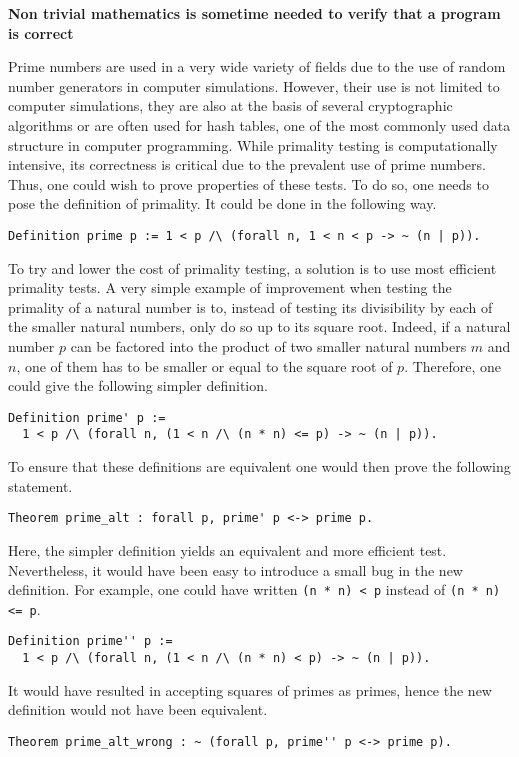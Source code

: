 \pagebreak
\begin{framed}
\begin{center}
{\bf \Large Non trivial mathematics is sometime needed to verify that a program is correct}
\end{center}

Prime numbers are used in a very wide variety of fields due
to the use of random number generators in computer simulations.
However, their use is not limited to computer simulations, they are
also at the basis of several cryptographic algorithms or are often
used for hash tables, one of the most commonly used data structure in
computer programming.  While primality testing is computationally
intensive, its correctness is critical due to the prevalent use of
prime numbers.  Thus, one could wish to prove properties of these
tests.  To do so, one needs to pose the definition of primality.  It
could be done in the following way.

\begin{verbatim}
Definition prime p := 1 < p /\ (forall n, 1 < n < p -> ~ (n | p)).
\end{verbatim}

To try and lower the cost of primality testing, a solution is to use
most efficient primality tests.  A very simple example of improvement
when testing the primality of a natural number is to, instead of
testing its divisibility by each of the smaller natural numbers, only
do so up to its square root.  Indeed, if a natural number $p$ can be
factored into the product of two smaller natural numbers $m$ and $n$,
one of them has to be smaller or equal to the square root of $p$.
Therefore, one could give the following simpler definition.

\begin{verbatim}
Definition prime' p :=
  1 < p /\ (forall n, (1 < n /\ (n * n) <= p) -> ~ (n | p)).
\end{verbatim}

To ensure that these definitions are equivalent one would then prove
the following statement.

\begin{verbatim}
Theorem prime_alt : forall p, prime' p <-> prime p.
\end{verbatim}

Here, the simpler definition yields an equivalent and more efficient
test.  Nevertheless, it would have been easy to introduce a small bug
in the new definition.  For example, one could have written
\verb!(n * n) < p! instead of \verb!(n * n) <= p!.

\begin{verbatim}
Definition prime'' p :=
  1 < p /\ (forall n, (1 < n /\ (n * n) < p) -> ~ (n | p)).
\end{verbatim}

It would have resulted in accepting squares of primes as primes, hence
the new definition would not have been equivalent.

\begin{verbatim}
Theorem prime_alt_wrong : ~ (forall p, prime'' p <-> prime p).
\end{verbatim}
\end{framed}
